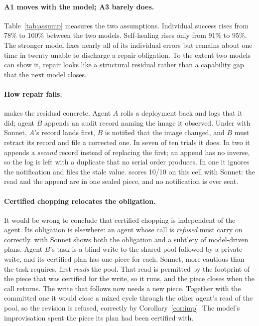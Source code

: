 \paragraph{A1 moves with the model; A3 barely does.}
Table~\ref{tab:assump} measures the two assumptions. Individual success rises
from 78\% to 100\% between the two models. Self-healing rises only from 91\%
to 95\%. The stronger model fixes nearly all of its individual errors but
remains about one time in twenty unable to discharge a repair obligation. To
the extent two models can show it, repair looks like a structural residual
rather than a capability gap that the next model closes.

\paragraph{How repair fails.}
 makes the residual concrete. Agent $A$ rolls a
deployment back and logs that it did; agent $B$ appends an audit record naming
the image it observed. Under \mtpo with Sonnet, $A$'s record lands first, $B$
is notified that the image changed, and $B$ must retract its record and file a
corrected one. In seven of ten trials it does. In two it appends a
\emph{second} record instead of replacing the first; an append has no
inverse, so the log is left with a duplicate that no serial order produces. In
one it ignores the notification and files the stale value. \cc scores 10/10 on
this cell with Sonnet: the read and the append are in one sealed piece, and no
notification is ever sent.

\paragraph{Certified chopping relocates the obligation.}
It would be wrong to conclude that certified chopping is independent of the
agent. Its obligation is elsewhere: an agent whose call is \emph{refused}
must carry on correctly.  with Sonnet shows both the
obligation and a subtlety of model-driven plans. Agent $B$'s task is a blind
write to the shared pool followed by a private write, and its certified plan
has one piece for each. Sonnet, more cautious than the task requires, first
\emph{reads} the pool. That read is permitted by the footprint of the piece
that was certified for the write, so it runs, and the piece closes when the
call returns. The write that follows now needs a new piece. Together with the
committed one it would close a mixed cycle through the other agent's read of
the pool, so the revision is refused, correctly by
Corollary~\ref{cor:imp}. The model's improvisation spent the piece its plan
had been certified with.


